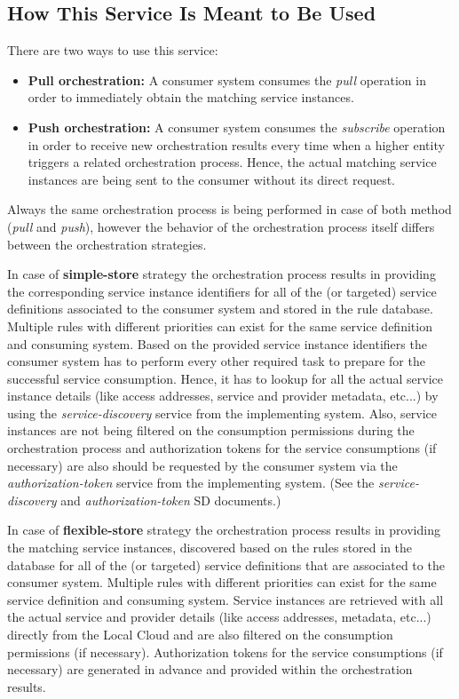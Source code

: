 \documentclass[a4paper]{arrowhead}
\begin{document}
\subsection{How This Service Is Meant to Be Used}

There are two ways to use this service:

\begin{itemize}
    \item \textbf{Pull orchestration:} A consumer system consumes the \textit{pull} operation in order to immediately obtain the matching service instances.
    \item \textbf{Push orchestration:} A consumer system consumes the \textit{subscribe} operation in order to receive new orchestration results every time when a higher entity triggers a related orchestration process. Hence, the actual matching service instances are being sent to the consumer without its direct request.
\end{itemize}

Always the same orchestration process is being performed in case of both method (\textit{pull} and \textit{push}), however the behavior of the orchestration process itself differs between the orchestration strategies.

In case of \textbf{simple-store} strategy the orchestration process results in providing the corresponding service instance identifiers for all of the (or targeted) service definitions associated to the consumer system and stored in the rule database. Multiple rules with different priorities can exist for the same service definition and consuming system. Based on the provided service instance identifiers the consumer system has to perform every other required task to prepare for the successful service consumption. Hence, it has to lookup for all the actual service instance details (like access addresses, service and provider metadata, etc...) by using the \textit{service-discovery} service from the implementing system. Also, service instances are not being filtered on the consumption permissions during the orchestration process and authorization tokens for the service consumptions (if necessary) are also should be requested by the consumer system via the \textit{authorization-token} service from the implementing system.
(See the \textit{service-discovery} and \textit{authorization-token} SD documents.)

In case of \textbf{flexible-store} strategy the orchestration process results in providing the matching service instances, discovered based on the rules stored in the database for all of the (or targeted) service definitions that are associated to the consumer system. Multiple rules with different priorities can exist for the same service definition and consuming system. Service instances are retrieved with all the actual service and provider details (like access addresses, metadata, etc...) directly from the Local Cloud and are also filtered on the consumption permissions (if necessary). Authorization tokens for the service consumptions (if necessary) are generated in advance and provided within the orchestration results. 
\end{document}
